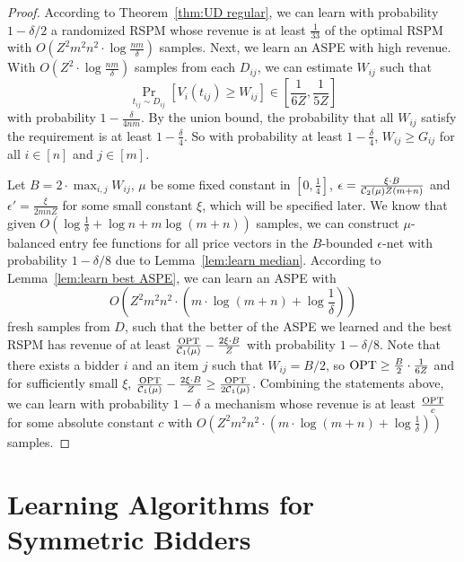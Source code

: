 \begin{proof}
According to Theorem~\ref{thm:UD regular}, we can learn with probability $1-\delta/2$ a randomized RSPM whose revenue is at least $\frac{1}{33}$ of the optimal RSPM with $O\left(Z^2m^2 n^2\cdot  \log \frac{nm}{\delta}\right)$ samples. Next, we learn an ASPE with high revenue.
	With $O\left( Z^2\cdot \log \frac{nm}{\delta} \right)$ samples from each $D_{ij}$, we can estimate $W_{ij}$ such that $$\Pr_{t_{ij}\sim D_{ij}}\left[V_i(t_{ij}) \geq W_{ij}\right]\in\left[\frac{1}{6Z}, \frac{1}{5Z}\right]$$ with probability $1-\frac{\delta}{4nm}$. By the union bound, the probability that all $W_{ij}$ satisfy the requirement is at least $1-\frac{\delta}{4}$. So with probability at least $1-\frac{\delta}{4}$, $W_{ij}\geq G_{ij}$ for all $i\in[n]$ and $j\in[m]$. 
	
	Let $B=2\cdot \max_{i,j} W_{ij}$, $\mu$ be some fixed constant in $[0,\frac{1}{4}]$, $\epsilon = \frac{\xi\cdot B}{{\mathcal{C}}_2(\mu) Z(m+n)}$ and $\epsilon' = \frac{\xi}{2mnZ}$ for some small constant $\xi$, which will be specified later. We know that given $O\left(\log \frac{1}{\delta}+ \log n +m\log ({m+n})\right)$ samples, we can construct $\mu$-balanced entry fee functions for all price vectors in the $B$-bounded $\epsilon$-net with probability $1-\delta/8$ due to Lemma~\ref{lem:learn median}. According to Lemma~\ref{lem:learn best ASPE}, we can learn an ASPE with $$O\left(Z^2m^2n^2 \cdot \left(m\cdot\log (m+n) + \log \frac{1}{\delta}\right)\right)$$ fresh samples from $D$, such that the better of the ASPE we learned and the best RSPM has revenue of at least $\frac{\text{OPT}}{{\mathcal{C}}_1(\mu)}-\frac{2\xi\cdot B}{Z}$ with probability $1-\delta/8$. Note that there exists a bidder $i$ and an item $j$ such that $W_{ij}=B/2$, so $\text{OPT}\geq \frac{B}{2}\cdot \frac{1}{6Z}$ and for sufficiently small $\xi$, $\frac{\text{OPT}}{{\mathcal{C}}_1(\mu)}-\frac{2\xi\cdot B}{Z}\geq \frac{\text{OPT}}{2{\mathcal{C}}_1(\mu)}$. Combining the statements above, we can learn with probability $1-\delta$ a mechanism whose revenue is at least $\frac{\text{OPT}}{c}$ for some absolute constant $c$ with $O\left(Z^2m^2n^2 \cdot \left(m\cdot\log (m+n) + \log \frac{1}{\delta}\right)\right)$ samples.

\end{proof}

\section{Learning Algorithms for Symmetric Bidders}\label{sec:symmetric appx}
